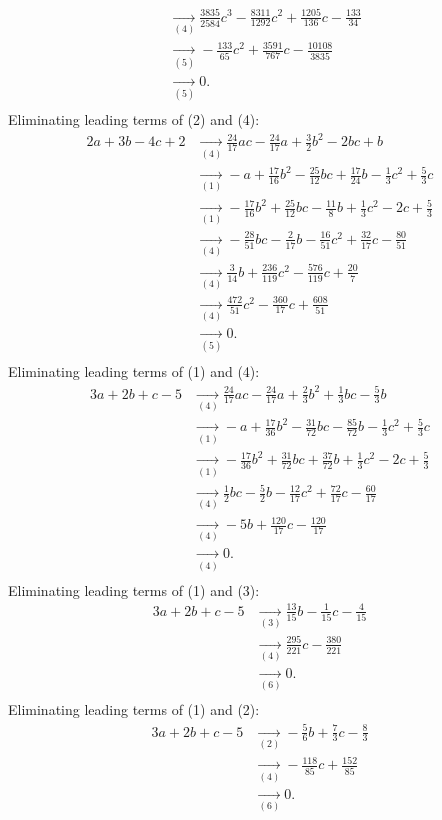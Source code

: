 {\begin{align*}
\\ &\underset{(4)}{\rightarrow}\frac{3835}{2584}c^{3}-\frac{8311}{1292}c^{2}+\frac{1205}{136}c-\frac{133}{34}
\\ &\underset{(5)}{\rightarrow}-\frac{133}{65}c^{2}+\frac{3591}{767}c-\frac{10108}{3835}
\\ &\underset{(5)}{\rightarrow}0
.\\ \end{align*}
Eliminating leading terms of (2) and (4):
\begin{align*}
2a+3b-4c+2&\underset{(4)}{\rightarrow}\frac{24}{17}ac-\frac{24}{17}a+\frac{3}{2}b^{2}-2bc+b
\\ &\underset{(1)}{\rightarrow}-a+\frac{17}{16}b^{2}-\frac{25}{12}bc+\frac{17}{24}b-\frac{1}{3}c^{2}+\frac{5}{3}c
\\ &\underset{(1)}{\rightarrow}-\frac{17}{16}b^{2}+\frac{25}{12}bc-\frac{11}{8}b+\frac{1}{3}c^{2}-2c+\frac{5}{3}
\\ &\underset{(4)}{\rightarrow}-\frac{28}{51}bc-\frac{2}{17}b-\frac{16}{51}c^{2}+\frac{32}{17}c-\frac{80}{51}
\\ &\underset{(4)}{\rightarrow}\frac{3}{14}b+\frac{236}{119}c^{2}-\frac{576}{119}c+\frac{20}{7}
\\ &\underset{(4)}{\rightarrow}\frac{472}{51}c^{2}-\frac{360}{17}c+\frac{608}{51}
\\ &\underset{(5)}{\rightarrow}0
.\\ \end{align*}
Eliminating leading terms of (1) and (4):
\begin{align*}
3a+2b+c-5&\underset{(4)}{\rightarrow}\frac{24}{17}ac-\frac{24}{17}a+\frac{2}{3}b^{2}+\frac{1}{3}bc-\frac{5}{3}b
\\ &\underset{(1)}{\rightarrow}-a+\frac{17}{36}b^{2}-\frac{31}{72}bc-\frac{85}{72}b-\frac{1}{3}c^{2}+\frac{5}{3}c
\\ &\underset{(1)}{\rightarrow}-\frac{17}{36}b^{2}+\frac{31}{72}bc+\frac{37}{72}b+\frac{1}{3}c^{2}-2c+\frac{5}{3}
\\ &\underset{(4)}{\rightarrow}\frac{1}{2}bc-\frac{5}{2}b-\frac{12}{17}c^{2}+\frac{72}{17}c-\frac{60}{17}
\\ &\underset{(4)}{\rightarrow}-5b+\frac{120}{17}c-\frac{120}{17}
\\ &\underset{(4)}{\rightarrow}0
.\\ \end{align*}
Eliminating leading terms of (1) and (3):
\begin{align*}
3a+2b+c-5&\underset{(3)}{\rightarrow}\frac{13}{15}b-\frac{1}{15}c-\frac{4}{15}
\\ &\underset{(4)}{\rightarrow}\frac{295}{221}c-\frac{380}{221}
\\ &\underset{(6)}{\rightarrow}0
.\\ \end{align*}
Eliminating leading terms of (1) and (2):
\begin{align*}
3a+2b+c-5&\underset{(2)}{\rightarrow}-\frac{5}{6}b+\frac{7}{3}c-\frac{8}{3}
\\ &\underset{(4)}{\rightarrow}-\frac{118}{85}c+\frac{152}{85}
\\ &\underset{(6)}{\rightarrow}0
.\\ \end{align*}
}
